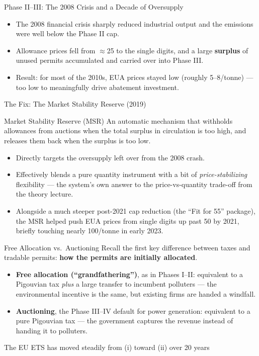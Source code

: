 \documentclass[11pt,aspectratio=169]{beamer}
\begin{document}
\begin{frame}{Phase II--III: The 2008 Crisis and a Decade of Oversupply}
	\begin{itemize}
		\item The 2008 financial crisis sharply reduced industrial output and the emissions were well below the Phase II cap.
		\item Allowance prices fell from $\approx$\texteuro{}25 to the single digits, and a large \textbf{surplus} of unused permits accumulated and carried over into Phase III.
		\item Result: for most of the 2010s, EUA prices stayed low (roughly \texteuro{}5--8/tonne) --- too low to meaningfully drive abatement investment.
	\end{itemize}
 
\end{frame}

\begin{frame}{The Fix: The Market Stability Reserve (2019)}
	\begin{block}{Market Stability Reserve (MSR)}
		An automatic mechanism that withholds allowances from auctions when the total surplus in circulation is too high, and releases them back when the surplus is too low.
	\end{block}
	\begin{itemize}
		\item Directly targets the oversupply left over from the 2008 crash.
		\item Effectively blends a pure quantity instrument with a bit of \emph{price-stabilizing} flexibility --- the system's own answer to the price-vs-quantity trade-off from the theory lecture.
		\item Alongside a much steeper post-2021 cap reduction (the ``Fit for 55'' package), the MSR helped push EUA prices from single digits up past \texteuro{}50 by 2021, briefly touching nearly \texteuro{}100/tonne in early 2023.
	\end{itemize}
\end{frame}

\begin{frame}{Free Allocation vs.\ Auctioning}
	Recall the first key difference between taxes and tradable permits: \textbf{how the permits are initially allocated}.
	\begin{itemize}
		\item \textbf{Free allocation (``grandfathering'')}, as in Phases I--II: equivalent to a Pigouvian tax \emph{plus} a large transfer to incumbent polluters --- the environmental incentive is the same, but existing firms are handed a windfall.
		\item \textbf{Auctioning}, the Phase III--IV default for power generation: equivalent to a pure Pigouvian tax --- the government captures the revenue instead of handing it to polluters.
	\end{itemize}
	\small The EU ETS has moved steadily from (i) toward (ii) over 20 years 
\end{frame}
\end{document}

